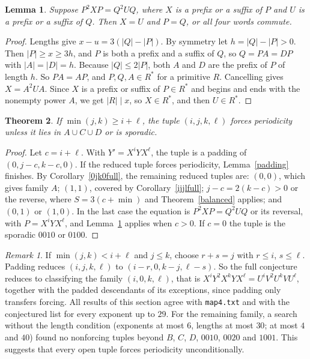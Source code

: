 \documentclass[11pt]{article}
\newtheorem{theorem}{Theorem}
\newtheorem{lemma}[theorem]{Lemma}
\theoremstyle{remark}\newtheorem*{remark}{Remark}
\begin{document}
\begin{lemma}\label{single}
Suppose \(P^2XP=Q^2UQ\), where \(X\) is a prefix or a suffix of \(P\) and \(U\) is a prefix or a suffix of \(Q\). Then \(X=U\) and \(P=Q\), or all four words commute.
\end{lemma}
\begin{proof}
Lengths give \(x-u=3(|Q|-|P|)\). By symmetry let \(h=|Q|-|P|>0\). Then \(|P|\ge x\ge3h\), and \(P\) is both a prefix and a suffix of \(Q\), so \(Q=PA=DP\) with \(|A|=|D|=h\). Because \(|Q|\le2|P|\), both \(A\) and \(D\) are the prefix of \(P\) of length \(h\). So \(PA=AP\), and \(P,Q,A\in R^*\) for a primitive \(R\). Cancelling gives \(X=A^2UA\). Since \(X\) is a prefix or suffix of \(P\in R^*\) and begins and ends with the nonempty power \(A\), we get \(|R|\mid x\), so \(X\in R^*\), and then \(U\in R^*\).
\end{proof}

\begin{theorem}\label{region}
If \(\min(j,k)\ge i+\ell\), the tuple \((i,j,k,\ell)\) forces periodicity unless it lies in \(A\cup C\cup D\) or is sporadic.
\end{theorem}
\begin{proof}
Let \(c=i+\ell\). With \(Y'=X^iYX^\ell\), the tuple is a padding of \((0,j-c,k-c,0)\). If the reduced tuple forces periodicity, Lemma~\ref{padding} finishes. By Corollary~\ref{0jk0full}, the remaining reduced tuples are: \((0,0)\), which gives family \(A\); \((1,1)\), covered by Corollary~\ref{ijjlfull}; \(j-c=2(k-c)>0\) or the reverse, where \(S=3(c+\min)\) and Theorem~\ref{balanced} applies; and \((0,1)\) or \((1,0)\). In the last case the equation is \(P^2XP=Q^2UQ\) or its reversal, with \(P=X^iYX^\ell\), and Lemma~\ref{single} applies when \(c>0\). If \(c=0\) the tuple is the sporadic \(0010\) or \(0100\).
\end{proof}

\begin{remark}
If \(\min(j,k)<i+\ell\) and \(j\le k\), choose \(r+s=j\) with \(r\le i\), \(s\le\ell\). Padding reduces \((i,j,k,\ell)\) to \((i-r,0,k-j,\ell-s)\). So the full conjecture reduces to classifying the family \((i,0,k,\ell)\), that is \(X^iY^2X^kYX^\ell=U^iV^2U^kVU^\ell\), together with the padded descendants of its exceptions, since padding only transfers forcing. All results of this section agree with \texttt{map4.txt} and with the conjectured list for every exponent up to \(29\). For the remaining family, a search without the length condition (exponents at most \(6\), lengths at most \(30\); at most \(4\) and \(40\)) found no nonforcing tuples beyond \(B\), \(C\), \(D\), \(0010\), \(0020\) and \(1001\). This suggests that every open tuple forces periodicity unconditionally.
\end{remark}
\end{document}
